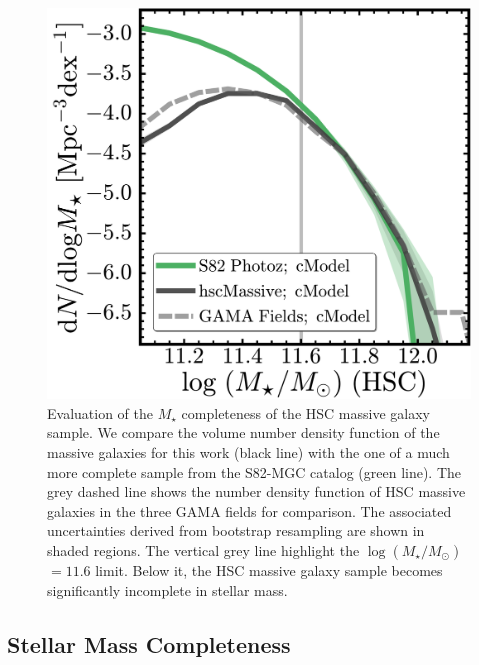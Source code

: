 \documentclass[a4paper,fleqn,usenatbib]{mnras}
\def\mstar{{$M_{\star}$}}
\def\logms{{$\log (M_{\star}/M_{\odot})$}}
\begin{document}
  \begin{figure}
      \centering 
      \includegraphics[width=\columnwidth]{fig/redbcg_completeness}
      \caption{
          Evaluation of the \mstar{} completeness of the HSC massive galaxy sample.
          We compare the volume number density function of the massive galaxies 
          for this work (black line) with the one of a much more complete sample
          from the S82-MGC catalog (green line). 
          The grey dashed line shows the number density function of HSC massive 
          galaxies in the three GAMA fields for comparison.
          The associated uncertainties derived from bootstrap resampling are shown in 
          shaded regions. 
          The vertical grey line highlight the \logms{}$=11.6$ limit.  
          Below it, the HSC massive galaxy sample becomes significantly incomplete in 
          stellar mass. 
          }
      \label{fig:mass_complete}
  \end{figure}     

\subsection{Stellar Mass Completeness}
    \label{ssec:complete}
    
\end{document}
